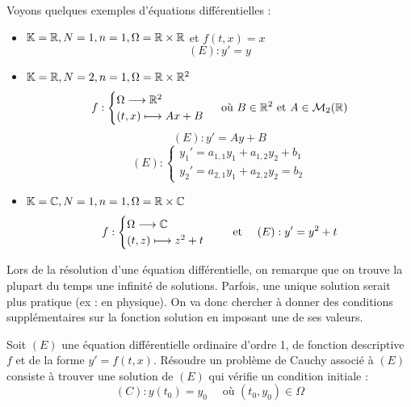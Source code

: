 \begin{example}
    Voyons quelques exemples d'équations différentielles : 
    \begin{itemize}
        \item $\mathbb{K} = \mathbb{R}, N = 1, n = 1, \Omega = \mathbb{R} \times \mathbb{R}$ et $f(t,x) = x $ 
            \[ (E) : y' = y \] 
        \item $\mathbb{K} = \mathbb{R}, N = 2, n = 1, \Omega = \mathbb{R} \times \mathbb{R}^2$
            \[ f : 
                \begin{cases}
                    \Omega \longrightarrow \mathbb{R}^2 \\ 
                    (t,x) \longmapsto Ax + B 
                \end{cases}
                \text{ où } B \in \mathbb{R}^2 \text{ et } A \in \mathcal{M}_2(\mathbb{R}) \] 
            \[ (E) : y' = Ay + B \] 
            \[ (E) : 
                \begin{cases}
                    y_1' = a_{1,1}y_1 + a_{1,2}y_2 + b_1 \\ 
                    y_2' = a_{2,1}y_1 + a_{2,2}y_2 = b_2
                \end{cases}
            \]
        \item $\mathbb{K} = \mathbb{C}, N = 1, n = 1, \Omega = \mathbb{R} \times \mathbb{C}$ 
            \[ f : 
                \begin{cases}
                    \Omega \longrightarrow \mathbb{C} \\ 
                    (t,z) \longmapsto z^2 + t 
                \end{cases}
                \quad \text{ et } \quad 
                (E) : y' = y^2 + t 
            \]
    \end{itemize}
\end{example}

Lors de la résolution d'une équation différentielle, on remarque que on trouve la plupart du temps une infinité de 
solutions. Parfois, une unique solution serait plus pratique (ex : en physique). On va donc chercher à donner des 
conditions supplémentaires sur la fonction solution en imposant une de ses valeurs. 

\begin{definition}
    Soit $(E)$ une équation différentielle ordinaire d'ordre 1, de fonction descriptive $f$ et de la forme $y' = f(t,x)$. 
    Résoudre un problème de Cauchy associé à $(E)$ consiste à trouver une solution de $(E)$ qui vérifie un condition initiale : 
    \[ (C) : y(t_0) = y_0 \quad \text{ où } (t_0,y_0) \in \Omega \] 
\end{definition}

